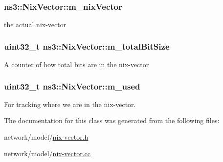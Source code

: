 \subsubsection[{\texorpdfstring{m\+\_\+nix\+Vector}{m_nixVector}}]{ ns3\+::\+Nix\+Vector\+::m\+\_\+nix\+Vector\hspace{0.3cm}{\ttfamily [private]}}\hypertarget{classns3_1_1NixVector_a8e3d193156da514255bb033ceb8500df}{}\label{classns3_1_1NixVector_a8e3d193156da514255bb033ceb8500df}


the actual nix-\/vector 

\subsubsection[{\texorpdfstring{m\+\_\+total\+Bit\+Size}{m_totalBitSize}}]{\setlength{\rightskip}{0pt plus 5cm}uint32\+\_\+t ns3\+::\+Nix\+Vector\+::m\+\_\+total\+Bit\+Size\hspace{0.3cm}{\ttfamily [private]}}\hypertarget{classns3_1_1NixVector_a7a49e3aa07e9d0d45fd509dc5f95857a}{}\label{classns3_1_1NixVector_a7a49e3aa07e9d0d45fd509dc5f95857a}
A counter of how total bits are in the nix-\/vector 
\subsubsection[{\texorpdfstring{m\+\_\+used}{m_used}}]{\setlength{\rightskip}{0pt plus 5cm}uint32\+\_\+t ns3\+::\+Nix\+Vector\+::m\+\_\+used\hspace{0.3cm}{\ttfamily [private]}}\hypertarget{classns3_1_1NixVector_a220076d3ab9a6ac07bfaee00360f1b18}{}\label{classns3_1_1NixVector_a220076d3ab9a6ac07bfaee00360f1b18}


For tracking where we are in the nix-\/vector. 



The documentation for this class was generated from the following files\+:\begin{DoxyCompactItemize}
\item 
network/model/\hyperlink{nix-vector_8h}{nix-\/vector.\+h}\item 
network/model/\hyperlink{nix-vector_8cc}{nix-\/vector.\+cc}\end{DoxyCompactItemize}
